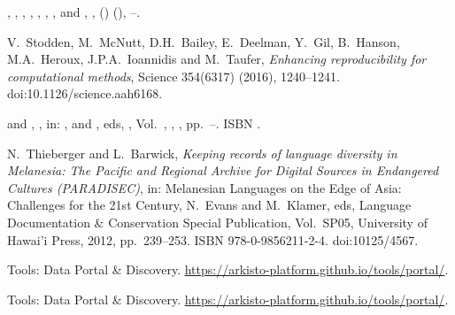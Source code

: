 \documentclass[ds,v1.1.2,openaccess]{iosart2x}%
\begin{document}
\begin{thebibliography}{}
%
\begin{barticle}
,
,
,
,
,
,
,
 and
,
,
()
(),
--.
\end{barticle}
%
\OrigBibText
V.~Stodden,
M.~{McNutt},
D.H.~Bailey,
E.~Deelman,
Y.~Gil,
B.~Hanson,
M.A.~Heroux,
J.P.A.~Ioannidis and
M.~Taufer,
\textit{Enhancing reproducibility for computational methods},
Science
354(6317)
(2016),
1240--1241.
doi:10.1126/science.aah6168.
\endOrigBibText
{}
\endbibitem

%
\begin{bchapter}
 and
,
,
in: ,
 and
, eds,
,
Vol.~,
,
,
pp.~--.
ISBN .
\end{bchapter}
%
\OrigBibText
N.~Thieberger and
L.~Barwick,
\textit{Keeping records of language diversity in Melanesia: The Pacific and
Regional Archive for Digital Sources in Endangered Cultures ({PARADISEC})},
in: Melanesian Languages on the Edge of Asia: Challenges for the 21st
Century,
N.~Evans and
M.~Klamer, eds,
Language Documentation \& Conservation Special Publication,
Vol.~SP05,
University of Hawai'i Press,
2012,
pp.~239--253.
ISBN 978-0-9856211-2-4.
doi:10125/4567.
\endOrigBibText
{}
\endbibitem

%
\begin{botherref}
{Tools: Data Portal \& Discovery}.
\url{https://arkisto-platform.github.io/tools/portal/}.
\end{botherref}
%
\OrigBibText
Tools: Data Portal \& Discovery.
\url{https://arkisto-platform.github.io/tools/portal/}.
\endOrigBibText
{}
\endbibitem


\end{thebibliography}
\end{document}
